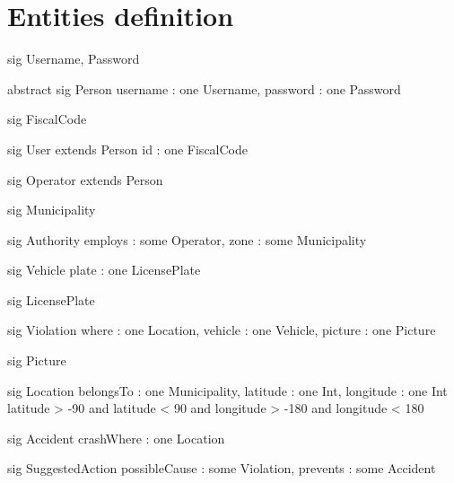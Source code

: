 \section{Entities definition}
\begin{alloy}
    sig Username, Password {}

    abstract sig Person {
        username : one Username,
        password : one Password
    }

    sig FiscalCode{}

    sig User extends Person {
        id : one FiscalCode
    }

    sig Operator extends Person {}

    sig Municipality {}

    sig Authority {
        employs : some Operator,
        zone : some Municipality
    }

    sig Vehicle {
        plate : one LicensePlate
    }

    sig LicensePlate {}

    sig Violation {
        where : one Location,
        vehicle : one Vehicle,
        picture : one Picture
    }

    sig Picture{}

    sig Location {
        belongsTo : one Municipality,
        latitude : one Int,
        longitude : one Int
    }{
        latitude > -90 and latitude < 90 and
        longitude > -180 and longitude < 180
    }

    sig Accident{
        crashWhere : one Location
    }

    sig SuggestedAction {
        possibleCause : some Violation,
        prevents : some Accident
    }
\end{alloy}